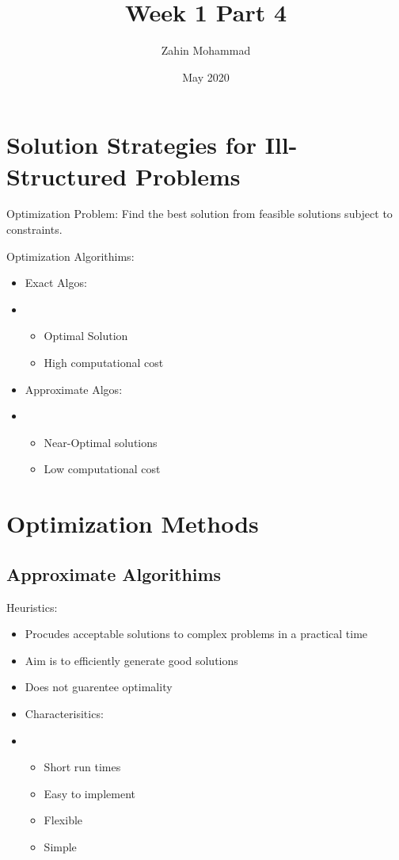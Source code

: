 \documentclass{article}
\title{Week 1 Part 4}
\author{Zahin Mohammad}
\date{May 2020}
\begin{document}
\maketitle
\section{Solution Strategies for Ill-Structured Problems}
    Optimization Problem: Find the best solution from feasible solutions subject to constraints.

    Optimization Algorithims:
    \begin{itemize}
        \item Exact Algos:
        \item  \begin{itemize}
            \item Optimal Solution
            \item High computational cost
        \end{itemize}
        \item Approximate Algos:
        \item \begin{itemize}
            \item Near-Optimal solutions
            \item Low computational cost
        \end{itemize}
    \end{itemize}

\section{Optimization Methods}
\subsection{Approximate Algorithims}
    Heuristics:
    \begin{itemize}
        \item Procudes acceptable solutions to complex problems in a practical time
        \item Aim is to efficiently generate good solutions
        \item Does not guarentee optimality
        \item Characterisitics:
        \item \begin{itemize}
            \item Short run times
            \item Easy to implement
            \item Flexible
            \item Simple
        \end{itemize}
    \end{itemize}
    
\end{document}
